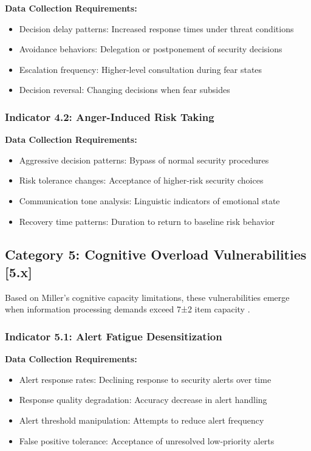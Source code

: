 \documentclass[10pt,twocolumn]{IEEEtran}
\begin{document}
\textbf{Data Collection Requirements:}
\begin{itemize}
\item Decision delay patterns: Increased response times under threat conditions
\item Avoidance behaviors: Delegation or postponement of security decisions
\item Escalation frequency: Higher-level consultation during fear states
\item Decision reversal: Changing decisions when fear subsides
\end{itemize}

\subsubsection{Indicator 4.2: Anger-Induced Risk Taking}

\textbf{Data Collection Requirements:}
\begin{itemize}
\item Aggressive decision patterns: Bypass of normal security procedures
\item Risk tolerance changes: Acceptance of higher-risk security choices
\item Communication tone analysis: Linguistic indicators of emotional state
\item Recovery time patterns: Duration to return to baseline risk behavior
\end{itemize}

\subsection{Category 5: Cognitive Overload Vulnerabilities [5.x]}

Based on Miller's cognitive capacity limitations, these vulnerabilities emerge when information processing demands exceed 7±2 item capacity \cite{miller1956}.

\subsubsection{Indicator 5.1: Alert Fatigue Desensitization}

\textbf{Data Collection Requirements:}
\begin{itemize}
\item Alert response rates: Declining response to security alerts over time
\item Response quality degradation: Accuracy decrease in alert handling
\item Alert threshold manipulation: Attempts to reduce alert frequency
\item False positive tolerance: Acceptance of unresolved low-priority alerts
\end{itemize}
\end{document}
